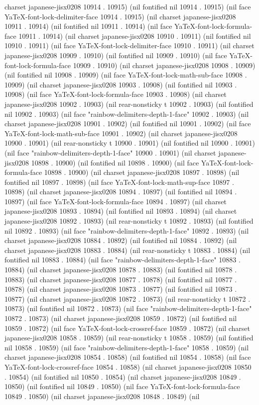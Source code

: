 charset japanese-jisx0208 10914 . 10915) (nil fontified nil 10914 . 10915) (nil face YaTeX-font-lock-delimiter-face 10914 . 10915) (nil charset japanese-jisx0208 10911 . 10914) (nil fontified nil 10911 . 10914) (nil face YaTeX-font-lock-formula-face 10911 . 10914) (nil charset japanese-jisx0208 10910 . 10911) (nil fontified nil 10910 . 10911) (nil face YaTeX-font-lock-delimiter-face 10910 . 10911) (nil charset japanese-jisx0208 10909 . 10910) (nil fontified nil 10909 . 10910) (nil face YaTeX-font-lock-formula-face 10909 . 10910) (nil charset japanese-jisx0208 10908 . 10909) (nil fontified nil 10908 . 10909) (nil face YaTeX-font-lock-math-sub-face 10908 . 10909) (nil charset japanese-jisx0208 10903 . 10908) (nil fontified nil 10903 . 10908) (nil face YaTeX-font-lock-formula-face 10903 . 10908) (nil charset japanese-jisx0208 10902 . 10903) (nil rear-nonsticky t 10902 . 10903) (nil fontified nil 10902 . 10903) (nil face "rainbow-delimiters-depth-1-face" 10902 . 10903) (nil charset japanese-jisx0208 10901 . 10902) (nil fontified nil 10901 . 10902) (nil face YaTeX-font-lock-math-sub-face 10901 . 10902) (nil charset japanese-jisx0208 10900 . 10901) (nil rear-nonsticky t 10900 . 10901) (nil fontified nil 10900 . 10901) (nil face "rainbow-delimiters-depth-1-face" 10900 . 10901) (nil charset japanese-jisx0208 10898 . 10900) (nil fontified nil 10898 . 10900) (nil face YaTeX-font-lock-formula-face 10898 . 10900) (nil charset japanese-jisx0208 10897 . 10898) (nil fontified nil 10897 . 10898) (nil face YaTeX-font-lock-math-sup-face 10897 . 10898) (nil charset japanese-jisx0208 10894 . 10897) (nil fontified nil 10894 . 10897) (nil face YaTeX-font-lock-formula-face 10894 . 10897) (nil charset japanese-jisx0208 10893 . 10894) (nil fontified nil 10893 . 10894) (nil charset japanese-jisx0208 10892 . 10893) (nil rear-nonsticky t 10892 . 10893) (nil fontified nil 10892 . 10893) (nil face "rainbow-delimiters-depth-1-face" 10892 . 10893) (nil charset japanese-jisx0208 10884 . 10892) (nil fontified nil 10884 . 10892) (nil charset japanese-jisx0208 10883 . 10884) (nil rear-nonsticky t 10883 . 10884) (nil fontified nil 10883 . 10884) (nil face "rainbow-delimiters-depth-1-face" 10883 . 10884) (nil charset japanese-jisx0208 10878 . 10883) (nil fontified nil 10878 . 10883) (nil charset japanese-jisx0208 10877 . 10878) (nil fontified nil 10877 . 10878) (nil charset japanese-jisx0208 10873 . 10877) (nil fontified nil 10873 . 10877) (nil charset japanese-jisx0208 10872 . 10873) (nil rear-nonsticky t 10872 . 10873) (nil fontified nil 10872 . 10873) (nil face "rainbow-delimiters-depth-1-face" 10872 . 10873) (nil charset japanese-jisx0208 10859 . 10872) (nil fontified nil 10859 . 10872) (nil face YaTeX-font-lock-crossref-face 10859 . 10872) (nil charset japanese-jisx0208 10858 . 10859) (nil rear-nonsticky t 10858 . 10859) (nil fontified nil 10858 . 10859) (nil face "rainbow-delimiters-depth-1-face" 10858 . 10859) (nil charset japanese-jisx0208 10854 . 10858) (nil fontified nil 10854 . 10858) (nil face YaTeX-font-lock-crossref-face 10854 . 10858) (nil charset japanese-jisx0208 10850 . 10854) (nil fontified nil 10850 . 10854) (nil charset japanese-jisx0208 10849 . 10850) (nil fontified nil 10849 . 10850) (nil face YaTeX-font-lock-formula-face 10849 . 10850) (nil charset japanese-jisx0208 10848 . 10849) (nil 